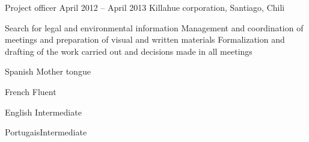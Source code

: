 \begin{joblist}
\item[Project officer]{April 2012 -- April 2013 }
	{Killahue corporation, Santiago, Chili}     
	{
		\iftbftiny \setlength{\parskip}{-10pt} \fi
		\begin{itemize}
			  \iftbftiny \setlength\itemsep{-3pt} \fi
			  \cvitem[\checkmark] Search for legal and environmental information
			  \cvitem[\checkmark] Management and coordination of meetings and preparation of visual and written materials
			  \cvitem[\checkmark] Formalization and drafting of the work carried out and decisions made in all meetings
		\end{itemize}      
	}
  
       

   

\end{joblist}


%
%


\begin{skilllist}

\begin{languagelist}
	\item{Spanish} 	{Mother tongue}	
	\item{French} 	{Fluent}	
	\item{English}  {Intermediate}	
	\item{Portugais}{Intermediate}
\end{languagelist}





\end{skilllist}





